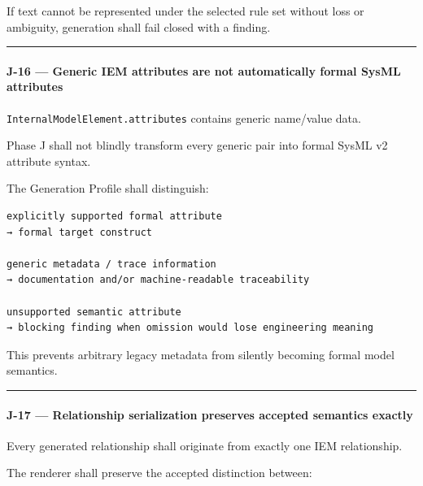 If text cannot be represented under the selected rule set without loss or ambiguity, generation shall fail closed with a finding.

\begin{center}\rule{0.5\linewidth}{0.5pt}\end{center}

\hypertarget{j-16--generic-iem-attributes-are-not-automatically-formal-sysml-attributes}{%
\paragraph{J-16 --- Generic IEM attributes are not automatically formal SysML attributes}\label{j-16--generic-iem-attributes-are-not-automatically-formal-sysml-attributes}}

\texttt{InternalModelElement.attributes} contains generic name/value data.

Phase J shall not blindly transform every generic pair into formal SysML v2 attribute syntax.

The Generation Profile shall distinguish:

\begin{verbatim}
explicitly supported formal attribute
→ formal target construct

generic metadata / trace information
→ documentation and/or machine-readable traceability

unsupported semantic attribute
→ blocking finding when omission would lose engineering meaning
\end{verbatim}

This prevents arbitrary legacy metadata from silently becoming formal model semantics.

\begin{center}\rule{0.5\linewidth}{0.5pt}\end{center}

\hypertarget{j-17--relationship-serialization-preserves-accepted-semantics-exactly}{%
\paragraph{J-17 --- Relationship serialization preserves accepted semantics exactly}\label{j-17--relationship-serialization-preserves-accepted-semantics-exactly}}

Every generated relationship shall originate from exactly one IEM relationship.

The renderer shall preserve the accepted distinction between:

